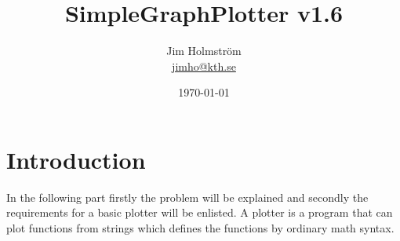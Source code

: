 \documentclass[a4paper,11pt]{kth-mag}
\title{SimpleGraphPlotter v1.6}
\subtitle{}
\author{Jim Holmstr\"{o}m\\\href{mailto:jimho@kth.se}{jimho@kth.se}}
\date{\today}
\begin{document}
\frontmatter
\pagestyle{empty}
\removepagenumbers
\maketitle
{}


\tableofcontents*
\mainmatter
\pagestyle{newchap}

\chapter{Introduction}
In the following part firstly the problem will be explained and secondly the requirements for a basic plotter will be enlisted.
A plotter is a program that can plot functions from strings which defines the functions by ordinary math syntax.
\end{document}
